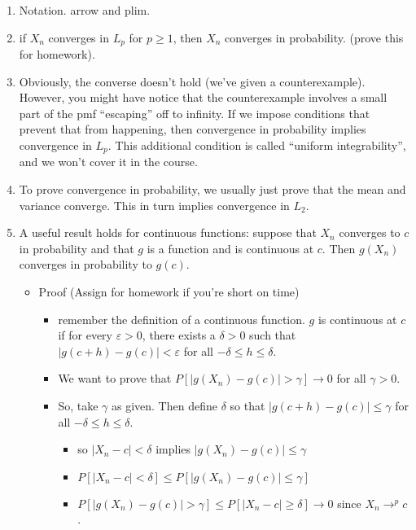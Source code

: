 \documentclass[11pt]{article}
\begin{document}
\begin{enumerate}
\item Notation. arrow and plim.
\item if $X_n$ converges in $L_p$ for $p \geq 1$, then $X_n$
          converges in probability.  (prove this for homework).
\item Obviously, the converse doesn't hold (we've given a
          counterexample).  However, you might have notice that the
          counterexample involves a small part of the pmf ``escaping'' off
          to infinity.  If we impose conditions that prevent that from
          happening, then convergence in probability implies convergence
          in $L_p$.  This additional condition is called ``uniform
          integrability'', and we won't cover it in the course.
\item To prove convergence in probability, we usually just prove that
          the mean and variance converge.  This in turn implies
          convergence in $L_2$.
\item A useful result holds for continuous functions: suppose that
          $X_n$ converges to $c$ in probability and that $g$ is a
          function and is continuous at $c$.  Then $g(X_n)$ converges in
          probability to $g(c)$.
\begin{itemize}
\item Proof (Assign for homework if you're short on time)
\begin{itemize}
\item remember the definition of a continuous function.  $g$ is
              continuous at $c$ if for every $\varepsilon >0$, there
              exists a $\delta > 0$ such that $|g(c + h) - g(c)| <
              \varepsilon$ for all $-\delta \leq h \leq \delta$.
\item We want to prove that $P[|g(X_n) - g(c)| > \gamma]
              \to 0$ for all $\gamma > 0$.
\item So, take $\gamma$ as given.  Then define $\delta$ so that
              $|g(c + h) - g(c)| \leq \gamma$ for all $-\delta \leq h \leq \delta$.
\begin{itemize}
\item so $|X_n - c| < \delta$ implies $|g(X_n) - g(c)| \leq \gamma$
\item $P[|X_n - c| < \delta] \leq P[|g(X_n) - g(c)| \leq \gamma]$
\item $P[|g(X_n) - g(c)| > \gamma] \leq P[|X_n - c| \geq \delta] \to 0$ 
                since $X_n \to^p c$.
\end{itemize}

\end{itemize}
\end{itemize}
\end{enumerate}
\end{document}
